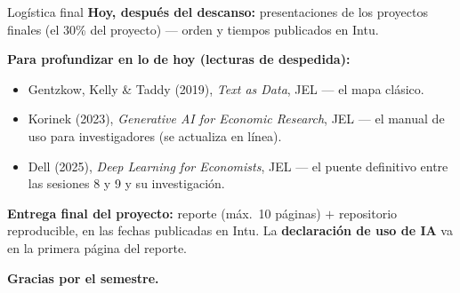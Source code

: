 \documentclass{beamer}
\newcommand{\1}{\mathbb{I}}
\begin{document}
\begin{frame}{Logística final}
\small
\textbf{Hoy, después del descanso:} presentaciones de los proyectos finales (el 30\% del proyecto) --- orden y tiempos publicados en Intu.
\pause

\vspace{0.2cm}
\textbf{Para profundizar en lo de hoy (lecturas de despedida):}
\begin{itemize}\itemsep4pt
  \item Gentzkow, Kelly \& Taddy (2019), \emph{Text as Data}, JEL --- el mapa clásico.
  \item Korinek (2023), \emph{Generative AI for Economic Research}, JEL --- el manual de uso para investigadores (se actualiza en línea).
  \item Dell (2025), \emph{Deep Learning for Economists}, JEL --- el puente definitivo entre las sesiones 8 y 9 y su investigación.
\end{itemize}
\pause

\vspace{0.2cm}
\textbf{Entrega final del proyecto:} reporte (máx.\ 10 páginas) $+$ repositorio reproducible, en las fechas publicadas en Intu. La \textbf{declaración de uso de IA} va en la primera página del reporte.
\pause

\vspace{0.2cm}
\centering \textbf{Gracias por el semestre.}
\end{frame}
\end{document}

